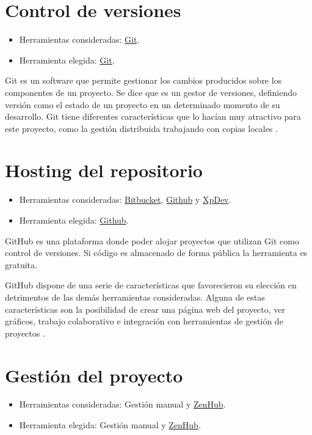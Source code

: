 \section{Control de versiones}

\begin{itemize}
\tightlist
\item
  Herramientas consideradas: \href{https://git-scm.com/}{Git}.
\item
  Herramienta elegida: \href{https://git-scm.com/}{Git}.
\end{itemize}

Git es un software que permite gestionar los cambios producidos sobre los componentes de un proyecto. Se dice que es un gestor de versiones, definiendo versión como el estado de un proyecto en un determinado momento de su desarrollo. Git tiene diferentes características que lo hacían muy atractivo para este proyecto, como la gestión distribuida trabajando con copias locales \cite{git:wiki}.

\section{Hosting del repositorio}

\begin{itemize}
\tightlist
\item
  Herramientas consideradas: \href{https://bitbucket.org/}{Bitbucket}, \href{https://github.com/}{Github} y \href{https://xp-dev.com/}{XpDev}.
\item
  Herramienta elegida: \href{https://github.com/}{Github}.
\end{itemize}

GitHub es una plataforma donde poder alojar proyectos que utilizan Git como control de versiones. Si código es almacenado de forma pública la herramienta es gratuita.

GitHub dispone de una serie de características que favorecieron su elección en detrimentos de las demás herramientas consideradas. Alguna de estas características son la posibilidad de crear una página web del proyecto, ver gráficos, trabajo colaborativo e integración con herramientas de gestión de proyectos \cite{github:wiki}.

\section{Gestión del proyecto}

\begin{itemize}
\tightlist
\item
  Herramientas consideradas: Gestión manual y \href{https://www.zenhub.com}{ZenHub}.
\item
  Herramienta elegida: Gestión manual y \href{https://www.zenhub.com}{ZenHub}.
\end{itemize}

